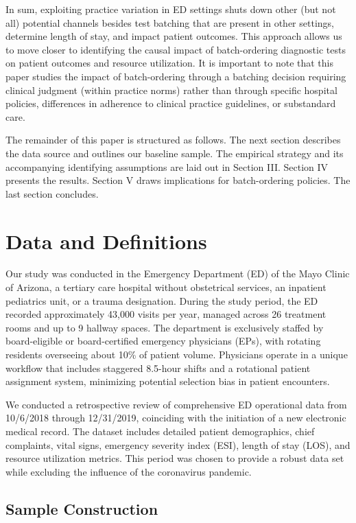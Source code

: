 \documentclass[,,nonblindrev]{informs}
\begin{document}
In sum, exploiting practice variation in ED settings shuts down other
(but not all) potential channels besides test batching that are present
in other settings, determine length of stay, and impact patient
outcomes. This approach allows us to move closer to identifying the
causal impact of batch-ordering diagnostic tests on patient outcomes and
resource utilization. It is important to note that this paper studies
the impact of batch-ordering through a batching decision requiring
clinical judgment (within practice norms) rather than through specific
hospital policies, differences in adherence to clinical practice
guidelines, or substandard care.

The remainder of this paper is structured as follows. The next section
describes the data source and outlines our baseline sample. The
empirical strategy and its accompanying identifying assumptions are laid
out in Section III. Section IV presents the results. Section V draws
implications for batch-ordering policies. The last section concludes.

\hypertarget{sec:II}{%
\section{Data and Definitions}\label{sec:II}}

Our study was conducted in the Emergency Department (ED) of the Mayo
Clinic of Arizona, a tertiary care hospital without obstetrical
services, an inpatient pediatrics unit, or a trauma designation. During
the study period, the ED recorded approximately 43,000 visits per year,
managed across 26 treatment rooms and up to 9 hallway spaces. The
department is exclusively staffed by board-eligible or board-certified
emergency physicians (EPs), with rotating residents overseeing about
10\% of patient volume. Physicians operate in a unique workflow that
includes staggered 8.5-hour shifts and a rotational patient assignment
system, minimizing potential selection bias in patient encounters.

We conducted a retrospective review of comprehensive ED operational data
from 10/6/2018 through 12/31/2019, coinciding with the initiation of a
new electronic medical record. The dataset includes detailed patient
demographics, chief complaints, vital signs, emergency severity index
(ESI), length of stay (LOS), and resource utilization metrics. This
period was chosen to provide a robust data set while excluding the
influence of the coronavirus pandemic.

\hypertarget{sample-construction}{%
\subsection{Sample Construction}\label{sample-construction}}
\end{document}

